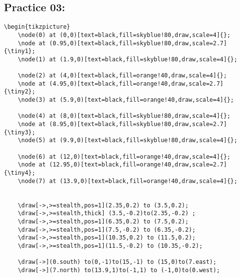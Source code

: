 \documentclass{article}
\begin{document}
		\subsection{Practice 03:}
\begin{lstlisting}
\begin{tikzpicture}
	\node(0) at (0,0)[text=black,fill=skyblue!80,draw,scale=4]{};
	\node at (0.95,0)[text=black,fill=skyblue!80,draw,scale=2.7]{\tiny1};
	\node(1) at (1.9,0)[text=black,fill=skyblue!80,draw,scale=4]{};
			
	\node(2) at (4,0)[text=black,fill=orange!40,draw,scale=4]{};
	\node at (4.95,0)[text=black,fill=orange!40,draw,scale=2.7]{\tiny2};
	\node(3) at (5.9,0)[text=black,fill=orange!40,draw,scale=4]{};
			
	\node(4) at (8,0)[text=black,fill=skyblue!80,draw,scale=4]{};
	\node at (8.95,0)[text=black,fill=skyblue!80,draw,scale=2.7]{\tiny3};
	\node(5) at (9.9,0)[text=black,fill=skyblue!80,draw,scale=4]{};
			
	\node(6) at (12,0)[text=black,fill=orange!40,draw,scale=4]{};
	\node at (12.95,0)[text=black,fill=orange!40,draw,scale=2.7]{\tiny4};
	\node(7) at (13.9,0)[text=black,fill=orange!40,draw,scale=4]{};
			
			
	\draw[->,>=stealth,pos=1](2.35,0.2) to (3.5,0.2);
	\draw[->,>=stealth,thick] (3.5,-0.2)to(2.35,-0.2) ;
	\draw[->,>=stealth,pos=1](6.35,0.2) to (7.5,0.2);
	\draw[->,>=stealth,pos=1](7.5,-0.2) to (6.35,-0.2);
	\draw[->,>=stealth,pos=1](10.35,0.2) to (11.5,0.2);
	\draw[->,>=stealth,pos=1](11.5,-0.2) to (10.35,-0.2);
			
	\draw[->](0.south) to(0,-1)to(15,-1) to (15,0)to(7.east);
	\draw[->](7.north) to(13.9,1)to(-1,1) to (-1,0)to(0.west);
\end{lstlisting}
\end{document}

